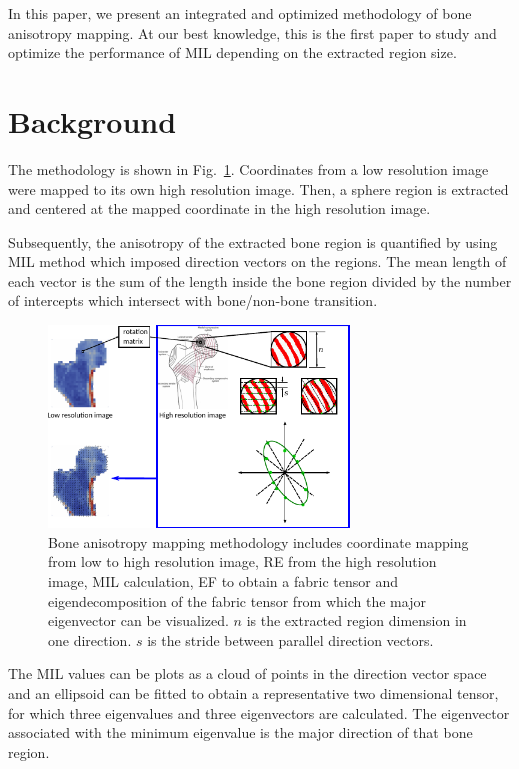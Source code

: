 \documentclass[letterpaper]{article}
\begin{document}
In this paper, we present an integrated and optimized methodology of bone anisotropy mapping. At our best knowledge, this is the first paper to study and optimize the performance of MIL depending on the extracted region size.
  
\section{Background}\label{sec:background}
The methodology is shown in Fig.~\ref{fig:method}. Coordinates from a low resolution image were mapped to its own high resolution image. Then, a sphere region is extracted and centered at the mapped coordinate in the high resolution image. 

Subsequently, the anisotropy of the extracted bone region is quantified by using MIL method which imposed direction vectors on the regions. The mean length of each vector is the sum of the length inside the bone region divided by the number of intercepts which intersect with bone/non-bone transition.

\begin{figure}[h]
    \centering
    \includegraphics[width=3.15in]{figs/overview.pdf}
    \caption{Bone anisotropy mapping methodology includes coordinate mapping from low to high resolution image, RE from the high resolution image, MIL calculation, EF to obtain a fabric tensor and eigendecomposition of the fabric tensor from which the major eigenvector can be visualized. $n$ is the extracted region dimension in one direction. $s$ is the stride between parallel direction vectors.}
    \label{fig:method}
\end{figure}

The MIL values can be plots as a cloud of points in the direction vector space and an ellipsoid can be fitted to obtain a representative two dimensional tensor, for which three eigenvalues and three eigenvectors are calculated. The eigenvector associated with the minimum eigenvalue is the major direction of that bone region.
\end{document}
